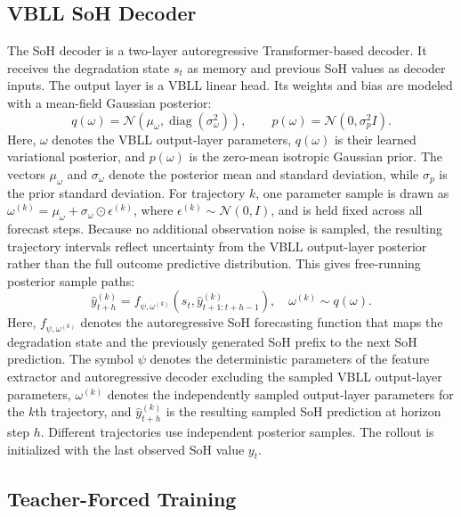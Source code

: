 \documentclass[conference]{IEEEtran}
\begin{document}
\subsection{VBLL SoH Decoder}

The SoH decoder is a two-layer autoregressive Transformer-based decoder. It
receives the degradation state $s_t$ as memory and previous SoH values as
decoder inputs. The output layer is a VBLL linear head. Its weights and bias are
modeled with a mean-field Gaussian posterior:
\begin{equation}
q(\omega)=\mathcal{N}(\mu_{\omega},\operatorname{diag}(\sigma_{\omega}^2)),
\qquad
p(\omega)=\mathcal{N}(0,\sigma_p^2 I).
\end{equation}
Here, $\omega$ denotes the VBLL output-layer parameters, $q(\omega)$ is their
learned variational posterior, and $p(\omega)$ is the zero-mean isotropic
Gaussian prior. The vectors $\mu_{\omega}$ and $\sigma_{\omega}$ denote the
posterior mean and standard deviation, while $\sigma_p$ is the prior standard
deviation. For trajectory $k$, one parameter sample is drawn as
$\omega^{(k)}=\mu_{\omega}+\sigma_{\omega}\odot\epsilon^{(k)}$, where
$\epsilon^{(k)}\sim\mathcal{N}(0,I)$, and is held fixed across all forecast
steps. Because no additional observation noise is sampled, the resulting
trajectory intervals reflect uncertainty from the VBLL output-layer posterior
rather than the full outcome predictive distribution. This gives free-running
posterior sample paths:
\begin{equation}
\hat{y}_{t+h}^{(k)} =
f_{\psi,\omega^{(k)}}(s_t, \hat{y}_{t+1:t+h-1}^{(k)}), \quad
\omega^{(k)} \sim q(\omega).
\end{equation}
Here, $f_{\psi,\omega^{(k)}}$ denotes the autoregressive SoH forecasting
function that maps the degradation state and the previously generated SoH
prefix to the next SoH prediction. The symbol $\psi$ denotes the deterministic parameters of the feature extractor and
autoregressive decoder excluding the sampled VBLL output-layer parameters,
$\omega^{(k)}$ denotes the independently sampled output-layer parameters for
the $k$th trajectory, and $\hat y_{t+h}^{(k)}$ is the resulting sampled SoH
prediction at horizon step $h$. Different trajectories use independent
posterior samples.
The rollout is initialized with the last observed SoH value $y_t$.

\subsection{Teacher-Forced Training}
\end{document}
